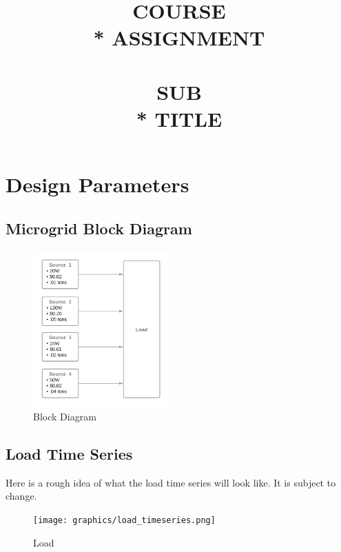 \documentclass{article}
\title{\Huge{\textbf{COURSE}  \\* ASSIGNMENT \\~\\ \textbf{SUB \\* TITLE}}}
\date{} %
\begin{document}



\section{Design Parameters}
    \subsection{Microgrid Block Diagram}
    \begin{figure}[h!]
    \begin{center}
        \includegraphics[height=6cm]{graphics/block_diagram.png}
    \end{center}
    \caption{Block Diagram}
    \label{fig:block}
    \end{figure}

    \subsection{Load Time Series}
    Here is a rough idea of what the load time series will look like. It is subject to change.
    \begin{figure}[h!]
        \begin{center}
            \texttt{[image: graphics/load\_timeseries.png]}
        \end{center}
        \caption{Load}
        \label{fig:load}
    \end{figure}
\end{document}
